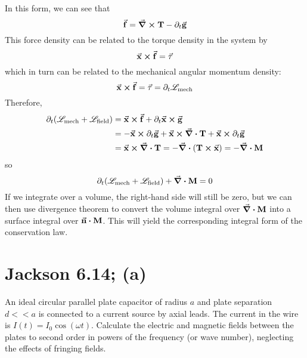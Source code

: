 \documentclass[a4paper,twoside]{article}
\begin{document}
\begin{problem}
        In this form, we can see that
        \begin{equation}
            \va{f} = \curl{ \vb{T}} - \partial_t \va{g}
        \end{equation}
        This force density can be related to the torque density in the system by
        \begin{equation}
            \va{x} \cross \va{f} = \va{\tau}
        \end{equation}
        which in turn can be related to the mechanical angular momentum density:
        \begin{equation}
            \va{x} \cross \va{f} = \va{\tau} = \partial_t \mathscr{L}_{\text{mech}}
        \end{equation}
        Therefore,
        \begin{align}
            \partial_t (\mathscr{L}_{\text{mech}} + \mathscr{L}_{\text{field}}) &= \va{x} \cross \va{f} + \partial_t \va{x} \cross \va{g} \\
            &= - \va{x} \cross \partial_t \va{g} + \va{x} \cross \div{ \vb{T}} + \va{x} \cross \partial_t \va{g} \\
            &= \va{x} \cross \div{ \vb{T}} = - \div{( \vb{T} \cross \va{x})} = - \div{ \vb{M}}
        \end{align}
        so
        \begin{equation}
            \partial_t (\mathscr{L}_{\text{mech}} + \mathscr{L}_{\text{field}}) + \div{ \vb{M}} = 0
        \end{equation}
        If we integrate over a volume, the right-hand side will still be zero, but we can then use divergence theorem to convert the volume integral over $ \div{ \vb{M}} $ into a surface integral over $ \va{n} \vdot \vb{M} $. This will yield the corresponding integral form of the conservation law.
\end{problem}

\section{Jackson 6.14; (a)}

An ideal circular parallel plate capacitor of radius $ a $ and plate separation $ d<<a $ is connected to a current source by axial leads. The current in the wire is $ I(t) = I_0 \cos(\omega t) $. Calculate the electric and magnetic fields between the plates to second order in powers of the frequency (or wave number), neglecting the effects of fringing fields.
\end{document}
